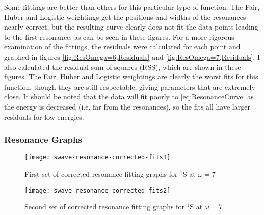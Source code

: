 \documentclass[Dissertation.tex]{subfiles}
\begin{document}
Some fittings are better than others for this particular type of function. 
The Fair, Huber and Logistic weightings get the positions and widths of the 
resonances nearly correct, but the resulting curve clearly does not fit the 
data points leading to the first resonance, as can be seen in these figures. 
For a more rigorous examination of the fittings, the residuals were 
calculated for each point and graphed in figures
\ref{fig:ResOmega=6,Residuals} and \ref{fig:ResOmega=7,Residuals}.
I also calculated the residual sum of 
squares (RSS), which are shown in these figures. The Fair, Huber and Logistic 
weightings are clearly the worst fits for this function, though they are 
still respectable, giving parameters that are extremely close. It should be 
noted that the data will fit poorly to \cref{eq:ResonanceCurve} as 
the energy is decreased (i.e. far from the resonances), so the fits all have 
larger residuals for low energies.






\cite{Tennyson1984} \cite{Stibbe1998} \cite{Sochi2013}



\subsubsection{Resonance Graphs}
\label{sec:ResonanceGraphs}






\begin{figure}[H]
	\centering
	\texttt{[image: swave-resonance-corrected-fits1]}
	\caption{First set of corrected resonance fitting graphs for $^1$S at $\omega = 7$}
	\label{fig:swave-resonance-corrected-fits1}
\end{figure}

\begin{figure}[H]
	\centering
	\texttt{[image: swave-resonance-corrected-fits2]}
	\caption{Second set of corrected resonance fitting graphs for $^1$S at $\omega = 7$}
	\label{fig:swave-resonance-corrected-fits2}
\end{figure}
\end{document}
